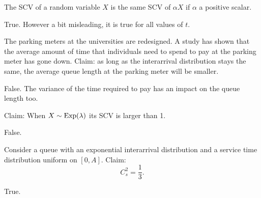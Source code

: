 \documentclass[stochastic-or.tex]{subfiles}
\begin{document}
\begin{truefalse}
The SCV of a random variable $X$ is the same SCV of $\alpha X$ if $\alpha$ a positive scalar.
    \begin{solution}
        True. However a bit misleading, it is true for all values of $t$.
    \end{solution}
\end{truefalse}

\begin{truefalse}
The parking meters at the universities are redesigned.
A study has shown that the average amount of time that individuals need to spend to pay at the parking  meter has gone down.
Claim: as long as the interarrival distribution stays the same, the average queue length at the parking meter will be smaller.
    \begin{solution}
        False.  The variance of the time required to pay has an impact on the queue length too.
    \end{solution}
\end{truefalse}

\begin{truefalse}
Claim: When $X\sim\mathrm{Exp}(\lambda)$ its SCV is larger than 1.
\begin{solution} False.
\end{solution}
\end{truefalse}


\begin{truefalse}
    Consider a queue with an exponential interarrival distribution and a service time distribution uniform on $[0,A]$. Claim:
    \begin{equation*}
        C_s^2 = \frac 13.
    \end{equation*}

    \begin{solution}
        True.
    \end{solution}
\end{truefalse}
\end{document}
